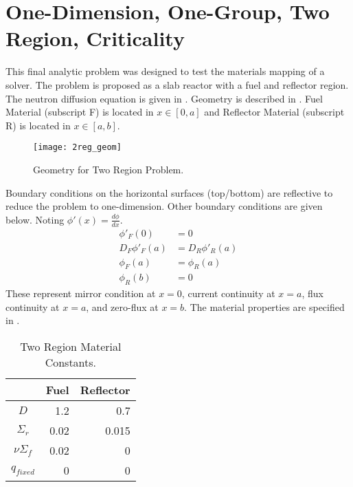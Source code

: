 \section{One-Dimension, One-Group, Two Region, Criticality}
  \label{sec:deriv_2reg}
  This final analytic problem was designed to test the materials mapping of a
  solver. The problem is proposed as a slab reactor with a fuel and reflector
  region. The neutron diffusion equation is given in  . 
  Geometry is described in . Fuel Material (subscript F) 
  is located in $x \in [0,a]$ and Reflector Material (subscript R) is located in
  $x \in [a,b]$.
  \begin{figure}
    \centering
    \texttt{[image: 2reg\_geom]}
    \caption{Geometry for Two Region Problem.}
    \label{fig:2reg_geom}
  \end{figure}
  Boundary conditions on the horizontal surfaces (top/bottom) are reflective
  to reduce the problem to one-dimension. Other boundary conditions are given
  below. Noting $\phi'(x) = \frac{d \phi}{dx}$.
  \begin{align}
    \label{eq:2reg_mirror}
    \phi'_F(0)&=0\\
    \label{eq:2reg_continuity}
    D_F\phi'_F(a)&=D_R\phi'_R(a) \\
    \label{eq:2reg_fluxcontinuity}
    \phi_F(a) &= \phi_R(a) \\
    \label{eq:2reg_zeroflux}
    \phi_R(b)&=0
  \end{align}
  These represent mirror condition at $x=0$, current continuity at $x=a$, flux
  continuity at $x=a$, and zero-flux at $x=b$. The material properties are 
  specified in .
  \begin{table}
    \caption{Two Region Material Constants.}
    \label{tab:2reg_constants}
    \begin{center}
      \begin{tabular}{crr}
        \toprule
        & Fuel & Reflector \\
        \midrule
        $D$ & 1.2 & 0.7 \\
        $\Sigma_r$ & 0.02 & 0.015 \\
        $\nu \Sigma_f$ & 0.02 & 0 \\
        $q_{fixed}$ & 0 & 0 \\
        \bottomrule
      \end{tabular}
    \end{center}
  \end{table}
  
